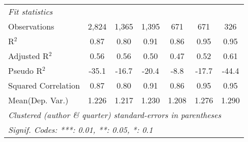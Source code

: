\begin{tabular}{lcccccc}
   \midrule
   \emph{Fit statistics}\\
   Observations                                               & 2,824        & 1,365   & 1,395         & 671          & 671            & 326\\  
   R$^2$                                                      & 0.87         & 0.80    & 0.91          & 0.86         & 0.95           & 0.95\\  
   Adjusted R$^2$                                             & 0.56         & 0.56    & 0.50          & 0.47         & 0.52           & 0.61\\  
   Pseudo R$^2$                                               & -35.1        & -16.7   & -20.4         & -8.8         & -17.7          & -44.4\\  
   Squared Correlation                                        & 0.87         & 0.80    & 0.91          & 0.86         & 0.95           & 0.95\\  
Mean(Dep. Var.) & 1.226 & 1.217 & 1.230 & 1.208 & 1.276 & 1.290 \\
   \midrule \midrule
   \multicolumn{7}{l}{\emph{Clustered (author \& quarter) standard-errors in parentheses}}\\
   \multicolumn{7}{l}{\emph{Signif. Codes: ***: 0.01, **: 0.05, *: 0.1}}\\
\end{tabular}
\par\endgroup
